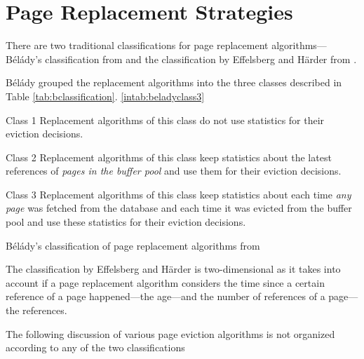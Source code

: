 \section{Page Replacement Strategies} \label{sec:page_replacement_strategies}

    There are two traditional classifications for page replacement algorithms---Bélády's classification from \cite{Belady:1966} and the classification by Effelsberg and Härder from \cite{Effelsberg:1984}.

    Bélády grouped the replacement algorithms into the three classes described in Table \ref{tab:bclassification}. \ref{intab:beladyclass3}

\begin{@empty}%
    \begin{table}[]
        \begin{labeleddescription}
            \item[Class 1] \label{intab:beladyclass1}  Replacement algorithms of this class do not use statistics for their eviction decisions.
            \item[Class 2] \label{intab:beladyclass2}  Replacement algorithms of this class keep statistics about the latest references of \emph{pages in the buffer pool} and use them for their eviction decisions.
            \item[Class 3] \label{intab:beladyclass3}  Replacement algorithms of this class keep statistics about each time \emph{any page} was fetched from the database and each time it was evicted from the buffer pool and use these statistics for their eviction decisions.
        \end{labeleddescription}
        \caption[Bélády's Classification]{Bélády's classification of page replacement algorithms from \cite{Belady:1966}}
        \label{tab:bclassification}
    \end{table}
\end{@empty}

    The classification by Effelsberg and Härder is two-dimensional as it takes into account if a page replacement algorithm considers the time since a certain reference of a page happened---the age---and the number of references of a page---the references. 

    The following discussion of various page eviction algorithms is not organized according to any of the two classifications 

